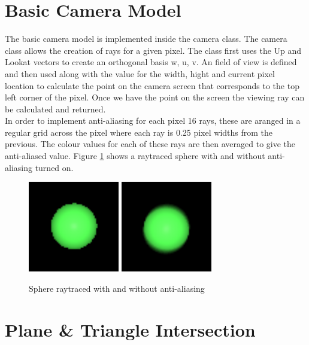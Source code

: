 \documentclass{article}
\begin{document}
\section{Basic Camera Model}

The basic camera model is implemented inside the camera class. The camera class
allows the creation of rays for a given pixel. The class first uses the Up and
Lookat vectors to create an orthogonal basis w, u, v. An field of view is defined
and then used along with the value for the width, hight and current pixel location
to calculate the point on the camera screen that corresponds to the top left corner
of the pixel. Once we have the point on the screen the viewing ray can be calculated
and returned.\\

In order to implement anti-aliasing for each pixel 16 rays, these are aranged in
a regular grid across the pixel where each ray is 0.25 pixel widths from the previous.
The colour values for each of these rays are then averaged to give the anti-aliased
value. Figure \ref{fig:antialias} shows a raytraced sphere with and without anti-aliasing
turned on.\\

\begin{figure}[H]
  \begin{center}
  \includegraphics[width=150px]{Images/antialiasOff.png}
  \includegraphics[width=150px]{Images/antialiasOn.png}
  \caption{Sphere raytraced with and without anti-aliasing}
  \label{fig:antialias}
  \end{center}
\end{figure}

\section{Plane \& Triangle Intersection}
\end{document}
